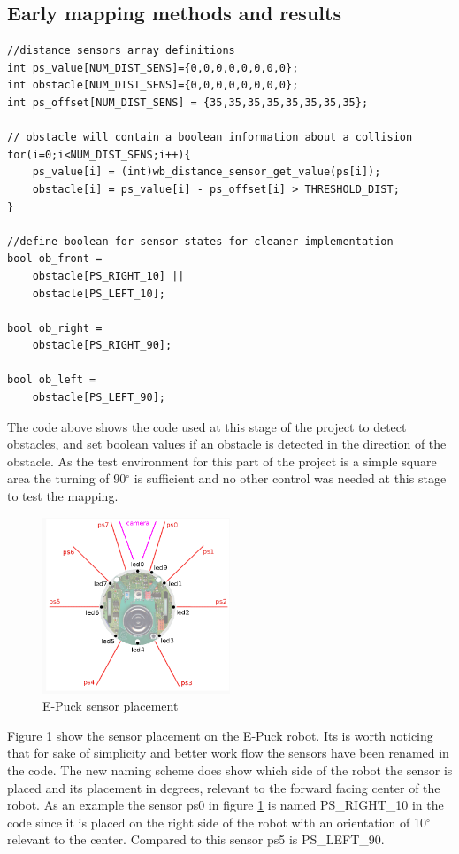 \subsection{Early mapping methods and results}

\begin{lstlisting}[caption={Proximity sensor reading}]
//distance sensors array definitions
int ps_value[NUM_DIST_SENS]={0,0,0,0,0,0,0,0};
int obstacle[NUM_DIST_SENS]={0,0,0,0,0,0,0,0};
int ps_offset[NUM_DIST_SENS] = {35,35,35,35,35,35,35,35};

// obstacle will contain a boolean information about a collision
for(i=0;i<NUM_DIST_SENS;i++){
	ps_value[i] = (int)wb_distance_sensor_get_value(ps[i]);
	obstacle[i] = ps_value[i] - ps_offset[i] > THRESHOLD_DIST;
}

//define boolean for sensor states for cleaner implementation
bool ob_front =
	obstacle[PS_RIGHT_10] ||
	obstacle[PS_LEFT_10];

bool ob_right =
	obstacle[PS_RIGHT_90];

bool ob_left =
	obstacle[PS_LEFT_90];
\end{lstlisting}

The code above shows the code used at this stage of the project to detect obstacles, and set boolean values if an obstacle is detected in the direction of the  obstacle. As the test environment for this part of the project is a simple square area the turning of 90$^{\circ}$ is sufficient and no other control was needed at this stage to test the mapping. 

\begin{figure}[h]
\centering
\includegraphics[width = 0.5\textwidth]{../../figures/e_puck_sensor_placement.png} 
\caption[E-Puck sensor placement]{E-Puck sensor placement\footnotemark}
\label{sensor_placement}
\end{figure}

Figure  \ref{sensor_placement} show the sensor placement on the E-Puck robot. Its is worth noticing that for sake of simplicity and better work flow the sensors have been renamed in the code. The new naming scheme does show which side of the robot the sensor is placed and its placement in degrees, relevant to the forward facing center of the robot. As an example the sensor ps0 in figure \ref{sensor_placement} is named PS\_RIGHT\_10 in the code since it is placed on the right side of the robot with an orientation of 10$^{\circ}$ relevant to the center.
Compared to this sensor ps5 is PS\_LEFT\_90.   \\[3ex]


